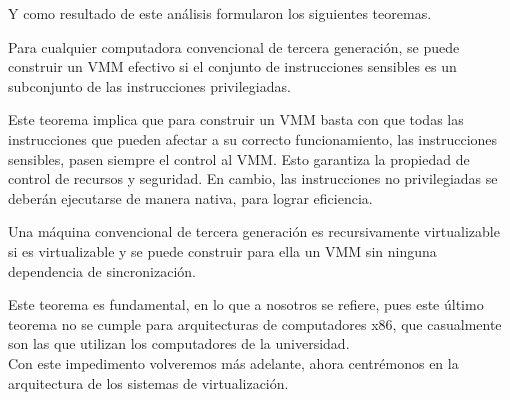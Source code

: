 \noindent Y como resultado de este análisis formularon los siguientes teoremas.
\begin{teorema}
Para cualquier computadora convencional de tercera generación, se puede construir un \gls{VMM} efectivo si el conjunto de instrucciones sensibles es un subconjunto de las instrucciones privilegiadas.
\end{teorema}

\noindent Este teorema implica que para construir un \gls{VMM} basta con que todas las instrucciones que pueden afectar a su correcto funcionamiento, las instrucciones sensibles, pasen siempre el control al \gls{VMM}. Esto garantiza la propiedad de control de recursos y seguridad. En cambio, las instrucciones no privilegiadas se deberán ejecutarse de manera nativa, para lograr eficiencia.

\begin{teorema}
Una máquina convencional de tercera generación es recursivamente virtualizable si es virtualizable y se puede construir para ella un \gls{VMM} sin ninguna dependencia de sincronización.
\end{teorema}

\noindent Este teorema es fundamental, en lo que a nosotros se refiere, pues este último teorema no se cumple para arquitecturas de computadores x86, que casualmente son las que utilizan los computadores de la universidad.\\

\noindent Con este impedimento volveremos más adelante, ahora centrémonos en la arquitectura de los sistemas de virtualización.